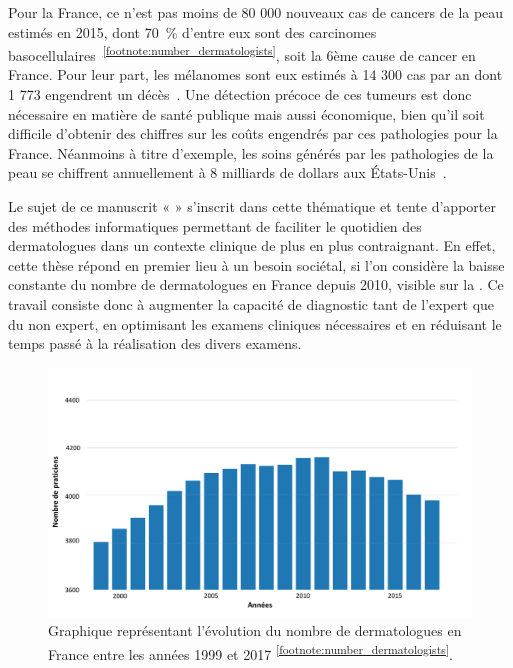 Pour la France, ce n’est pas moins de 80 000 nouveaux cas de cancers de la peau estimés en 2015, dont 70~\% d'entre eux sont des carcinomes basocellulaires~\textsuperscript{\ref{footnote:number_dermatologists}}, soit la 6ème cause de cancer en France. Pour leur part, les mélanomes sont eux estimés à 14 300 cas par an dont 1 773 engendrent un décès~\cite{Thuret2012}. Une détection précoce de ces tumeurs est donc nécessaire en matière de santé publique mais aussi économique, bien qu'il soit difficile d'obtenir des chiffres sur les coûts engendrés par ces pathologies pour la France. Néanmoins à titre d'exemple, les soins générés par les pathologies de la peau se chiffrent annuellement à 8 milliards de dollars aux États-Unis~\cite{Farberg2017a}.\par

\addtocounter{footnote}{1}

Le sujet de ce manuscrit « \titleref » s’inscrit dans cette thématique et tente d’apporter des méthodes informatiques permettant de faciliter le quotidien des dermatologues dans un contexte clinique de plus en plus contraignant. En effet, cette thèse répond en premier lieu à un besoin sociétal, si l'on considère la baisse constante du nombre de dermatologues en France depuis 2010, visible sur la . Ce travail consiste donc à augmenter la capacité de diagnostic tant de l'expert que du non expert, en optimisant les examens cliniques nécessaires et en réduisant le temps passé à la réalisation des divers examens.\par

\begin{figure}[H]
    \centering
    \includegraphics[width=\linewidth]{contents/i_introduction/resources/evolution_dermatologists.pdf}
    \caption{Graphique représentant l'évolution du nombre de dermatologues en France entre les années 1999 et 2017 \textsuperscript{\ref{footnote:number_dermatologists}}.}
    \label{fig:number_dermatologists}
\end{figure}\par
\addtocounter{footnote}{1}

